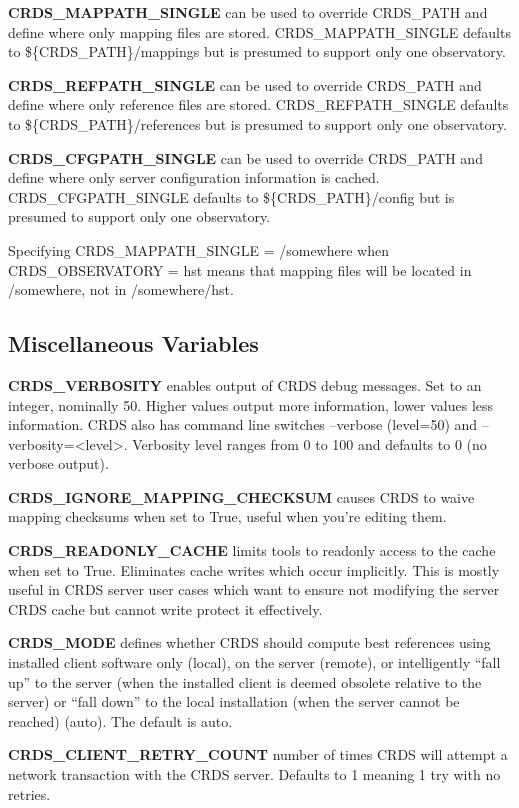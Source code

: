 \documentclass[letterpaper,10pt,english]{sphinxmanual}
\begin{document}
\textbf{CRDS\_MAPPATH\_SINGLE} can be used to override CRDS\_PATH and define where only
mapping files are stored. CRDS\_MAPPATH\_SINGLE defaults to \$\{CRDS\_PATH\}/mappings
but is presumed to support only one observatory.

\textbf{CRDS\_REFPATH\_SINGLE} can be used to override CRDS\_PATH and define where
only reference files are stored.  CRDS\_REFPATH\_SINGLE defaults to \$\{CRDS\_PATH\}/references
but is presumed to support only one observatory.

\textbf{CRDS\_CFGPATH\_SINGLE} can be used to override CRDS\_PATH and define where
only server configuration information is cached.   CRDS\_CFGPATH\_SINGLE defaults to
\$\{CRDS\_PATH\}/config but is presumed to support only one observatory.

Specifying CRDS\_MAPPATH\_SINGLE = /somewhere when CRDS\_OBSERVATORY = hst means that
mapping files will be located in /somewhere,  not in /somewhere/hst.


\subsection{Miscellaneous Variables}
\label{installation:miscellaneous-variables}
\textbf{CRDS\_VERBOSITY} enables output of CRDS debug messages.   Set to an
integer,  nominally 50.   Higher values output more information,  lower
values less information.   CRDS also has command line switches
--verbose (level=50) and --verbosity=\textless{}level\textgreater{}.   Verbosity level
ranges from 0 to 100 and defaults to 0 (no verbose output).

\textbf{CRDS\_IGNORE\_MAPPING\_CHECKSUM} causes CRDS to waive mapping checksums
when set to True,  useful when you're editing them.

\textbf{CRDS\_READONLY\_CACHE} limits tools to readonly access to the cache when set
to True.  Eliminates cache writes which occur implicitly.  This is mostly
useful in CRDS server user cases which want to ensure not modifying the server
CRDS cache but cannot write protect it effectively.

\textbf{CRDS\_MODE} defines whether CRDS should compute best references using
installed client software only (local),  on the server (remote),  or
intelligently ``fall up'' to the server (when the installed client is deemed
obsolete relative to the server) or ``fall down'' to the local installation
(when the server cannot be reached) (auto).   The default is auto.

\textbf{CRDS\_CLIENT\_RETRY\_COUNT} number of times CRDS will attempt a network
transaction with the CRDS server.  Defaults to 1 meaning 1 try with no retries.
\end{document}
